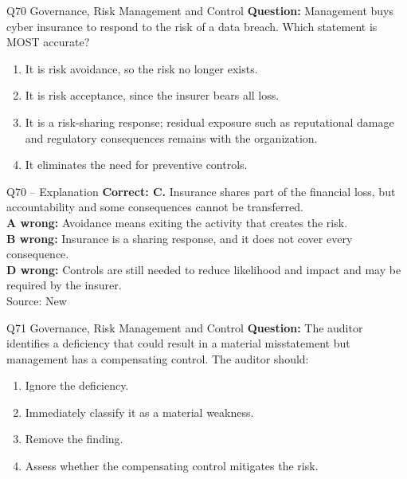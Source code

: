 \documentclass[aspectratio=169,10pt]{beamer}
\begin{document}
\begin{frame}[t]{Q70 \hfill {\scriptsize Governance, Risk Management and Control}}
	\small
	\textbf{Question:} Management buys cyber insurance to respond to the risk of a data breach. Which statement is MOST accurate?
	\begin{enumerate}[label=\Alph*.,itemsep=1pt,topsep=3pt]
			\item It is risk avoidance, so the risk no longer exists.
			\item It is risk acceptance, since the insurer bears all loss.
			\item It is a risk-sharing response; residual exposure such as reputational damage and regulatory consequences remains with the organization.
			\item It eliminates the need for preventive controls.
	\end{enumerate}
\end{frame}

\begin{frame}[t]{Q70 -- Explanation}
	\footnotesize
	\textbf{Correct: C.} Insurance shares part of the financial loss, but accountability and some consequences cannot be transferred. \\[5pt]
\textbf{A wrong:} Avoidance means exiting the activity that creates the risk. \\[3pt]
\textbf{B wrong:} Insurance is a sharing response, and it does not cover every consequence. \\[3pt]
\textbf{D wrong:} Controls are still needed to reduce likelihood and impact and may be required by the insurer. \\[3pt]
	\vfill {\tiny Source: New}
\end{frame}

\begin{frame}[t]{Q71 \hfill {\scriptsize Governance, Risk Management and Control}}
	\small
	\textbf{Question:} The auditor identifies a deficiency that could result in a material misstatement but management has a compensating control. The auditor should:
	\begin{enumerate}[label=\Alph*.,itemsep=1pt,topsep=3pt]
			\item Ignore the deficiency.
			\item Immediately classify it as a material weakness.
			\item Remove the finding.
			\item Assess whether the compensating control mitigates the risk.
	\end{enumerate}
\end{frame}
\end{document}
